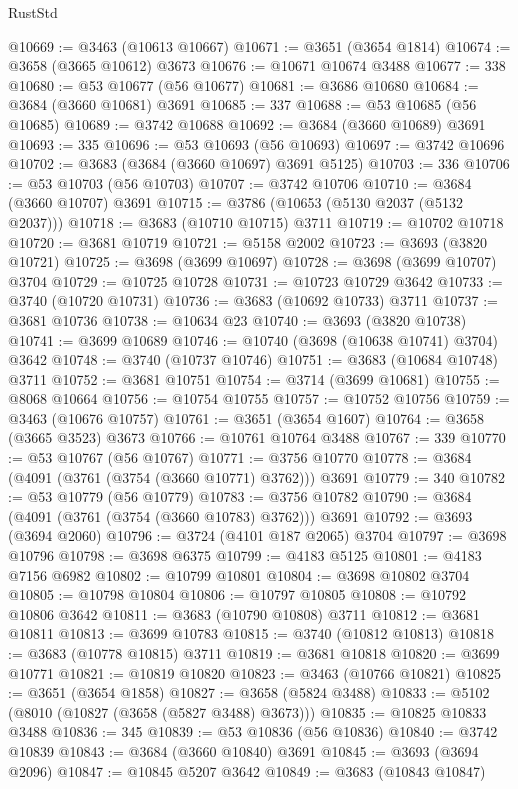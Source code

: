 \begin{lexlean}{RustStd}
\begin{coremodule}
{\begin{coremodule}
{{{{{{{{{{{{{{{{{{{{{{{{{{{{{{{{{{{{{{{{{{{{{{{@10669 := @3463 (@10613 @10667)
@10671 := @3651 (@3654 @1814)
@10674 := @3658 (@3665 @10612) @3673
@10676 := @10671 @10674 @3488
@10677 := 338
@10680 := @53 @10677 (@56 @10677)
@10681 := @3686 @10680
@10684 := @3684 (@3660 @10681) @3691
@10685 := 337
@10688 := @53 @10685 (@56 @10685)
@10689 := @3742 @10688
@10692 := @3684 (@3660 @10689) @3691
@10693 := 335
@10696 := @53 @10693 (@56 @10693)
@10697 := @3742 @10696
@10702 := @3683 (@3684 (@3660 @10697) @3691 @5125)
@10703 := 336
@10706 := @53 @10703 (@56 @10703)
@10707 := @3742 @10706
@10710 := @3684 (@3660 @10707) @3691
@10715 := @3786 (@10653 (@5130 @2037 (@5132 @2037)))
@10718 := @3683 (@10710 @10715) @3711
@10719 := @10702 @10718
@10720 := @3681 @10719
@10721 := @5158 @2002
@10723 := @3693 (@3820 @10721)
@10725 := @3698 (@3699 @10697)
@10728 := @3698 (@3699 @10707) @3704
@10729 := @10725 @10728
@10731 := @10723 @10729 @3642
@10733 := @3740 (@10720 @10731)
@10736 := @3683 (@10692 @10733) @3711
@10737 := @3681 @10736
@10738 := @10634 @23
@10740 := @3693 (@3820 @10738)
@10741 := @3699 @10689
@10746 := @10740 (@3698 (@10638 @10741) @3704) @3642
@10748 := @3740 (@10737 @10746)
@10751 := @3683 (@10684 @10748) @3711
@10752 := @3681 @10751
@10754 := @3714 (@3699 @10681)
@10755 := @8068 @10664
@10756 := @10754 @10755
@10757 := @10752 @10756
@10759 := @3463 (@10676 @10757)
@10761 := @3651 (@3654 @1607)
@10764 := @3658 (@3665 @3523) @3673
@10766 := @10761 @10764 @3488
@10767 := 339
@10770 := @53 @10767 (@56 @10767)
@10771 := @3756 @10770
@10778 := @3684 (@4091 (@3761 (@3754 (@3660 @10771) @3762))) @3691
@10779 := 340
@10782 := @53 @10779 (@56 @10779)
@10783 := @3756 @10782
@10790 := @3684 (@4091 (@3761 (@3754 (@3660 @10783) @3762))) @3691
@10792 := @3693 (@3694 @2060)
@10796 := @3724 (@4101 @187 @2065) @3704
@10797 := @3698 @10796
@10798 := @3698 @6375
@10799 := @4183 @5125
@10801 := @4183 @7156 @6982
@10802 := @10799 @10801
@10804 := @3698 @10802 @3704
@10805 := @10798 @10804
@10806 := @10797 @10805
@10808 := @10792 @10806 @3642
@10811 := @3683 (@10790 @10808) @3711
@10812 := @3681 @10811
@10813 := @3699 @10783
@10815 := @3740 (@10812 @10813)
@10818 := @3683 (@10778 @10815) @3711
@10819 := @3681 @10818
@10820 := @3699 @10771
@10821 := @10819 @10820
@10823 := @3463 (@10766 @10821)
@10825 := @3651 (@3654 @1858)
@10827 := @3658 (@5824 @3488)
@10833 := @5102 (@8010 (@10827 (@3658 (@5827 @3488) @3673)))
@10835 := @10825 @10833 @3488
@10836 := 345
@10839 := @53 @10836 (@56 @10836)
@10840 := @3742 @10839
@10843 := @3684 (@3660 @10840) @3691
@10845 := @3693 (@3694 @2096)
@10847 := @10845 @5207 @3642
@10849 := @3683 (@10843 @10847)
}}}}}}}}}}}}}}}}}}}}}}}}}}}}}}}}}}}}}}}}}}}}}}}
\end{coremodule}}
\end{coremodule}
\end{lexlean}

